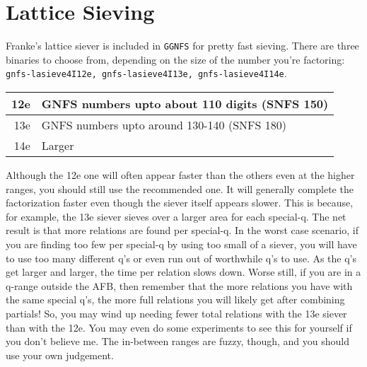 \documentclass[12pt]{article}
\begin{document}
\section{Lattice Sieving}
  Franke's lattice siever is included in {\tt GGNFS} for pretty
  fast sieving. There are three binaries to choose from, depending
  on the size of the number you're factoring: 
  {\tt gnfs-lasieve4I12e, gnfs-lasieve4I13e, gnfs-lasieve4I14e}.\\
  \begin{center}\begin{tabular}{|r|l|}
    \hline
    12e & GNFS numbers upto about 110 digits (SNFS 150) \\
    \hline
    13e & GNFS numbers upto around 130-140 (SNFS 180) \\
    \hline
    14e & Larger \\
    \hline
  \end{tabular}\end{center}
  Although the 12e one will often appear faster than the others even
  at the higher ranges, you should still use the recommended one. It will
  generally complete the factorization faster even though the siever itself
  appears slower. This is because, for example, the 13e siever sieves over
  a larger area for each special-q. The net result is that more relations
  are found per special-q. In the worst case scenario, if you are finding too
  few per special-q by using too small of a siever, you will have to use too
  many different q's or even run out of worthwhile q's to use. As the q's get
  larger and larger, the time per relation slows down. Worse still, if you
  are in a q-range outside the AFB, then remember that the more relations
  you have with the same special q's, the more full relations you will likely
  get after combining partials! So, you may wind up needing fewer total relations
  with the 13e siever than with the 12e. You may even do some experiments to
  see this for yourself if you don't believe me. The in-between ranges are fuzzy,
  though, and you should use your own judgement.
\end{document}
